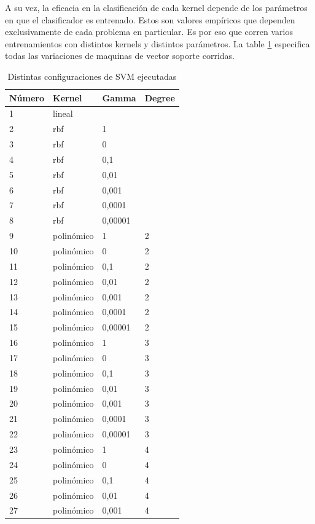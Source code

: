 \documentclass[journal]{IEEEtran}
\begin{document}
A su vez, la eficacia en la clasificación de cada kernel depende de los
parámetros en que el clasificador es entrenado. Estos son valores empíricos
que dependen exclusivamente de cada problema en particular. Es por eso
que corren varios entrenamientos con distintos kernels y distintos parámetros.
La table \ref{table:svm_config} especifica todas las variaciones de maquinas 
de vector soporte corridas.

\begin{table}[ht!]
\caption{Distintas configuraciones de SVM ejecutadas}
\label{table:svm_config}
\centering
\begin{tabular}{l | l l l }
Número & Kernel & Gamma & Degree  \\
\hline
1 & lineal &  &  \\ 
2 & rbf  & 1  &  \\ 
3 & rbf  & 0 &  \\ 
4 & rbf  & 0,1 &  \\ 
5 & rbf  & 0,01 &  \\ 
6 & rbf  & 0,001 &  \\ 
7 & rbf  & 0,0001 &  \\ 
8 & rbf  & 0,00001 &  \\ 
9 & polinómico & 1  & 2 \\ 
10 & polinómico & 0  & 2 \\ 
11 & polinómico & 0,1  & 2 \\ 
12 & polinómico & 0,01  & 2 \\ 
13 & polinómico & 0,001  & 2 \\ 
14 & polinómico & 0,0001  & 2 \\ 
15 & polinómico & 0,00001  & 2 \\ 
16 & polinómico & 1  & 3 \\ 
17 & polinómico & 0  & 3 \\ 
18 & polinómico & 0,1  & 3 \\ 
19 & polinómico & 0,01  & 3 \\ 
20 & polinómico & 0,001  & 3 \\ 
21 & polinómico & 0,0001  & 3 \\ 
22 & polinómico & 0,00001  & 3 \\ 
23 & polinómico & 1  & 4 \\ 
24 & polinómico & 0  & 4 \\ 
25 & polinómico & 0,1  & 4 \\ 
26 & polinómico & 0,01  & 4 \\ 
27 & polinómico & 0,001  & 4 \\ 

\end{tabular}
\end{table}
\end{document}
